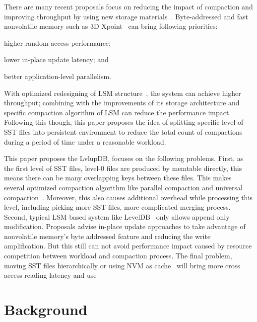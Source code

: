 \documentclass[letterpaper,twocolumn,10pt]{article}
\begin{document}
There are many recent proposals focus on reducing the impact of compaction and improving throughput by using new storage materials~\cite{kannan2018redesigning,chen2017kvftl,zhang2017flashkv,xia2017hikv,wu2018kvssd,sun2018co,shen2017didacache}. Byte-addressed and fast nonvolatile memory such as 3D Xpoint~\cite{3dxpoint} can bring following priorities:
\begin{inparaenum}[1)]
    \item higher random access performance;
    \item lower in-place update latency; and
    \item better application-level parallelism.
\end{inparaenum}
With optimized redesigning of LSM structure~\cite{kannan2018redesigning}, the system can achieve higher throughput; combining with the improvements of its storage architecture and specific compaction algorithm of LSM can reduce the performance impact. Following this though, this paper proposes the idea of splitting specific level of SST files into persistent environment to reduce the total count of compactions during a period of time under a reasonable workload.

This paper proposes the LvlupDB, focuses on the following problems. First, as the first level of SST files, level-0 files are produced by memtable directly, this means there can be many overlapping keys between these files. This makes several optimized compaction algorithm like parallel compaction and universal compaction~\cite{comapction_types,dayan2017monkey}. Moreover, this also causes additional overhead while processing this level, including picking more SST files, more complicated merging process. Second, typical LSM based system like LevelDB~\cite{LevelDBo14} only allows append only modification. Proposals\cite{kannan2018redesigning} advise in-place update approaches to take advantage of nonvolatile memory's  byte addressed feature and reducing the write amplification. But this still can not avoid performance impact caused by resource competition between workload and compaction process. The final problem, moving SST files hierarchically\cite{} or using NVM as cache~\cite{NVMRocks} will bring more cross access reading latency and use 


\section{Background}
\end{document}

